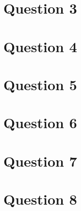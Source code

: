\documentclass{article}
\begin{document}
\section{Question 3}

\section{Question 4}

\section{Question 5}

\section{Question 6}

\section{Question 7}

\section{Question 8}
\end{document}
